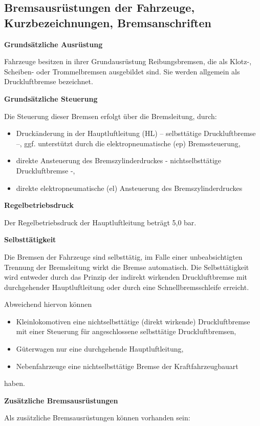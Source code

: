 \subsection{Bremsausrüstungen der Fahrzeuge, Kurzbezeichnungen, Bremsanschriften}
\textbf{Grundsätzliche Ausrüstung}\par
Fahrzeuge besitzen in ihrer Grundausrüstung Reibungsbremsen, die als Klotz-, Scheiben- oder Trommelbremsen ausgebildet sind. Sie werden allgemein als Druckluftbremse bezeichnet.\par
\textbf{Grundsätzliche Steuerung}\par
Die Steuerung dieser Bremsen erfolgt über die Bremsleitung, durch:
\begin{itemize}
    \item Druckänderung in der Hauptluftleitung (HL) – selbsttätige Druckluftbremse –, ggf. unterstützt durch die elektropneumatische (ep) Bremssteuerung,
    \item direkte Ansteuerung des Bremszylinderdruckes - nichtselbsttätige Druckluftbremse -,
    \item direkte elektropneumatische (el) Ansteuerung des Bremszylinderdruckes
\end{itemize}
\textbf{Regelbetriebsdruck}\par
Der Regelbetriebsdruck der Hauptluftleitung beträgt 5,0 bar.\par
\textbf{Selbsttätigkeit}\par
Die Bremsen der Fahrzeuge sind selbsttätig, im Falle einer unbeabsichtigten Trennung der Bremsleitung wirkt die Bremse automatisch. Die Selbsttätigkeit wird entweder durch das Prinzip der indirekt wirkenden Druckluftbremse mit durchgehender Hauptluftleitung oder durch eine Schnellbremsschleife erreicht.\par
Abweichend hiervon können
\begin{itemize}
    \item Kleinlokomotiven eine nichtselbsttätige (direkt wirkende) Druckluftbremse mit einer Steuerung für angeschlossene selbsttätige Druckluftbremsen,
    \item Güterwagen nur eine durchgehende Hauptluftleitung,
    \item Nebenfahrzeuge eine nichtselbsttätige Bremse der Kraftfahrzeugbauart 
\end{itemize}
haben.\par
\textbf{Zusätzliche Bremsausrüstungen}\par
Als zusätzliche Bremsausrüstungen können vorhanden sein:
